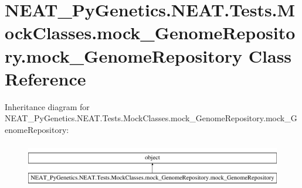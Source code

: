 \hypertarget{class_n_e_a_t___py_genetics_1_1_n_e_a_t_1_1_tests_1_1_mock_classes_1_1mock___genome_repository_1_1mock___genome_repository}{}\section{N\+E\+A\+T\+\_\+\+Py\+Genetics.\+N\+E\+A\+T.\+Tests.\+Mock\+Classes.\+mock\+\_\+\+Genome\+Repository.\+mock\+\_\+\+Genome\+Repository Class Reference}
\label{class_n_e_a_t___py_genetics_1_1_n_e_a_t_1_1_tests_1_1_mock_classes_1_1mock___genome_repository_1_1mock___genome_repository}
Inheritance diagram for N\+E\+A\+T\+\_\+\+Py\+Genetics.\+N\+E\+A\+T.\+Tests.\+Mock\+Classes.\+mock\+\_\+\+Genome\+Repository.\+mock\+\_\+\+Genome\+Repository\+:\begin{figure}[H]
\begin{center}
\leavevmode
\includegraphics[height=1.982301cm]{class_n_e_a_t___py_genetics_1_1_n_e_a_t_1_1_tests_1_1_mock_classes_1_1mock___genome_repository_1_1mock___genome_repository}
\end{center}
\end{figure}
